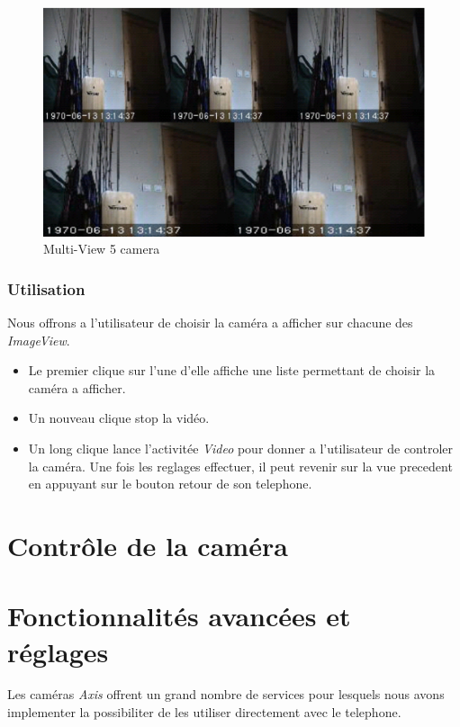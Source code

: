 \begin{figure}[H]
  \label{5cam.eps}
  \centering
   \includegraphics[scale=0.4]{Images/5cam.eps}
  \caption{Multi-View 5 camera}
\end{figure}  
\subsubsection{Utilisation}
Nous offrons a l'utilisateur de choisir la caméra a afficher sur chacune des
\textit{ImageView}. 
\begin{itemize}
\item Le premier clique sur l'une d'elle affiche une liste permettant de
choisir la caméra a afficher.
\item Un nouveau clique stop la vidéo.
\item Un long clique lance l'activitée \textit{Video} pour donner a
l'utilisateur de controler la caméra. Une fois les reglages effectuer, il peut
revenir sur la vue precedent en appuyant sur le bouton retour de son telephone.
\end{itemize}

\section{Contrôle de la caméra}

\section{Fonctionnalités avancées et réglages}
Les caméras \textit{Axis} offrent un grand nombre de services pour lesquels
nous avons implementer la possibiliter de les utiliser directement avec le
telephone.
